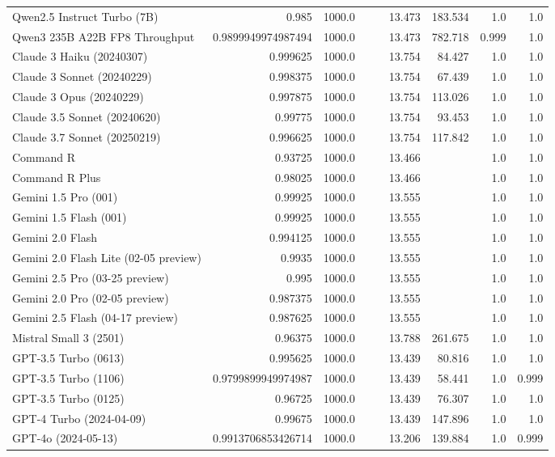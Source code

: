 \begin{table}[htp]
{\begin{tabular}{lrrrrrrrr}
Qwen2.5 Instruct Turbo (7B) & 0.985 & 1000.0 &  &  & 13.473 & 183.534 & 1.0 & 1.0 \\
Qwen3 235B A22B FP8 Throughput & 0.9899949974987494 & 1000.0 &  &  & 13.473 & 782.718 & 0.999 & 1.0 \\
Claude 3 Haiku (20240307) & 0.999625 & 1000.0 &  &  & 13.754 & 84.427 & 1.0 & 1.0 \\
Claude 3 Sonnet (20240229) & 0.998375 & 1000.0 &  &  & 13.754 & 67.439 & 1.0 & 1.0 \\
Claude 3 Opus (20240229) & 0.997875 & 1000.0 &  &  & 13.754 & 113.026 & 1.0 & 1.0 \\
Claude 3.5 Sonnet (20240620) & 0.99775 & 1000.0 &  &  & 13.754 & 93.453 & 1.0 & 1.0 \\
Claude 3.7 Sonnet (20250219) & 0.996625 & 1000.0 &  &  & 13.754 & 117.842 & 1.0 & 1.0 \\
Command R & 0.93725 & 1000.0 &  &  & 13.466 &  & 1.0 & 1.0 \\
Command R Plus & 0.98025 & 1000.0 &  &  & 13.466 &  & 1.0 & 1.0 \\
Gemini 1.5 Pro (001) & 0.99925 & 1000.0 &  &  & 13.555 &  & 1.0 & 1.0 \\
Gemini 1.5 Flash (001) & 0.99925 & 1000.0 &  &  & 13.555 &  & 1.0 & 1.0 \\
Gemini 2.0 Flash & 0.994125 & 1000.0 &  &  & 13.555 &  & 1.0 & 1.0 \\
Gemini 2.0 Flash Lite (02-05 preview) & 0.9935 & 1000.0 &  &  & 13.555 &  & 1.0 & 1.0 \\
Gemini 2.5 Pro (03-25 preview) & 0.995 & 1000.0 &  &  & 13.555 &  & 1.0 & 1.0 \\
Gemini 2.0 Pro (02-05 preview) & 0.987375 & 1000.0 &  &  & 13.555 &  & 1.0 & 1.0 \\
Gemini 2.5 Flash (04-17 preview) & 0.987625 & 1000.0 &  &  & 13.555 &  & 1.0 & 1.0 \\
Mistral Small 3 (2501) & 0.96375 & 1000.0 &  &  & 13.788 & 261.675 & 1.0 & 1.0 \\
GPT-3.5 Turbo (0613) & 0.995625 & 1000.0 &  &  & 13.439 & 80.816 & 1.0 & 1.0 \\
GPT-3.5 Turbo (1106) & 0.9799899949974987 & 1000.0 &  &  & 13.439 & 58.441 & 1.0 & 0.999 \\
GPT-3.5 Turbo (0125) & 0.96725 & 1000.0 &  &  & 13.439 & 76.307 & 1.0 & 1.0 \\
GPT-4 Turbo (2024-04-09) & 0.99675 & 1000.0 &  &  & 13.439 & 147.896 & 1.0 & 1.0 \\
GPT-4o (2024-05-13) & 0.9913706853426714 & 1000.0 &  &  & 13.206 & 139.884 & 1.0 & 0.999 \\

\end{tabular}}
\end{table}
